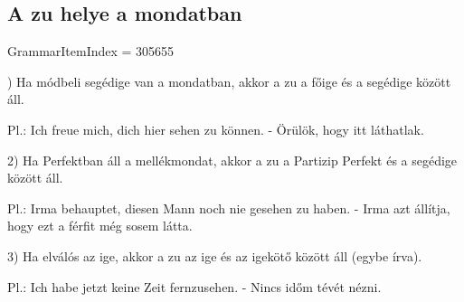 \documentclass{article}
\newenvironment{desc}{\verbatim}{\endverbatim}
\begin{document}
\subsection{A zu helye a mondatban}

GrammarItemIndex = 305655

\begin{desc}
1) Ha módbeli segédige van a mondatban, akkor a zu a főige és a segédige között áll.

Pl.: Ich freue mich, dich hier sehen zu können. - Örülök, hogy itt láthatlak.

2) Ha Perfektban áll a mellékmondat, akkor a zu a Partizip Perfekt és a segédige között áll.

Pl.: Irma behauptet, diesen Mann noch nie gesehen zu haben. - Irma azt állítja, hogy ezt a férfit még sosem látta.

3) Ha elválós az ige, akkor a zu az ige és az igekötő között áll (egybe írva).

Pl.: Ich habe jetzt keine Zeit fernzusehen. - Nincs időm tévét nézni.
\end{desc}
\end{document}
